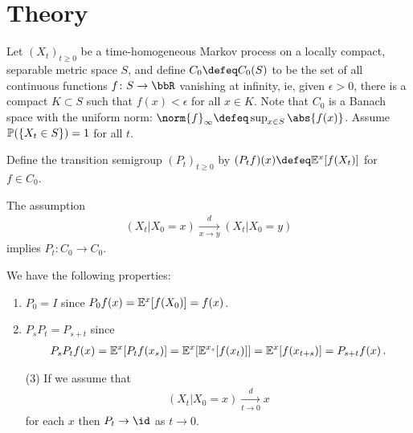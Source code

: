 \documentclass[../../../Master/AppliedStochastics.tex]{subfiles}
\author{Helen}
\date{24 October 2018}
\begin{document}
%


\makelecture


\section{Theory}

Let $(X_t)_{t \geq 0}$ be a time-homogeneous Markov process
    on a locally compact, separable metric space $S$,
    and define $C_0 \defeq C_0(S)$ to be the set of
        all continuous functions $f \colon S \to \bbR$ vanishing at infinity,
        ie, given $\epsilon > 0$, there is a compact $K \subset S$ such that
            $f(x) < \epsilon$ for all $x \in K$.
Note that $C_0$ is a Banach space with the uniform norm:
    $\norm{f}_{\infty} \defeq \sup_{x \in S} \abs{f(x)}$.
Assume $\P(\{X_t \in S\}) = 1$ for all $t$.


\begin{definition}
Define the transition semigroup $(P_t)_{t \geq 0}$ by
    $(P_t f)(x) \defeq \E^{x}[f(X_t)]$ for $f \in C_0$. 
\end{definition}


\begin{note}
The assumption
$$\begin{aligned}\label{Feller1}
    (X_t | X_0 = x) \xrightarrow[x \to y]{d} (X_t | X_0 = y)
\end{aligned}$$
    implies $P_t \colon C_0 \to C_0$.
\end{note}


We have the following properties: 
\begin{enumerate}
    \item
    $P_0 = I$ since $P_0 f(x) = \E^{x} [f(X_0)] = f(x)$.
    
    \item
    $P_s P_t = P_{s + t}$ since
    $$\begin{aligned}
        P_s P_t f(x) = \E^{x}[P_t f(x_s) ]
                     = \E^{x} [ \E^{x_s} [ f(x_t) ] ]
                     = \E^{x} [ f(x_{t+s})]
                     = P_{s+t} f(x)\,.
    \end{aligned}$$
    
    \item[(3)] 
    If we assume that
    $$\begin{aligned}\label{Feller2}
        (X_t | X_0 = x) \xrightarrow[t \to 0]{d} x
    \end{aligned}$$
        for each $x$ then
    $P_t \to \id$ as $t \to 0$. 
\end{enumerate}
\end{document}
